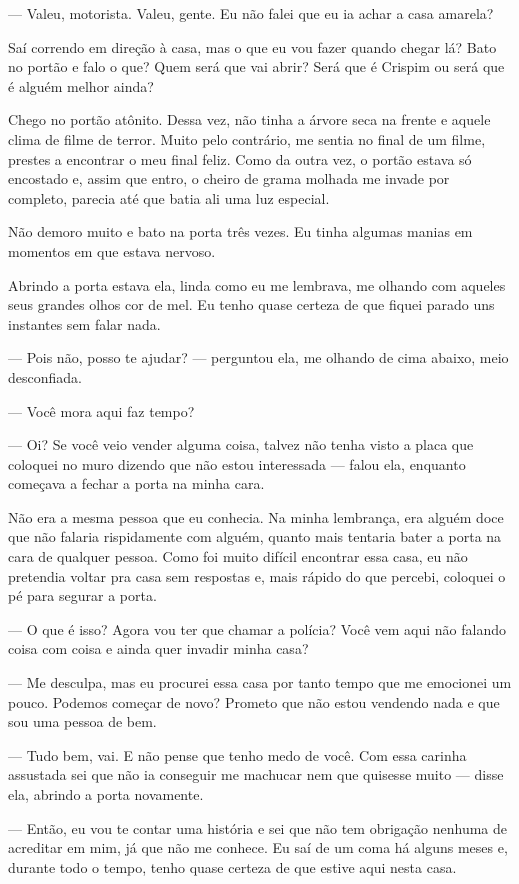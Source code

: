 — Valeu, motorista. Valeu, gente. Eu não falei que eu ia achar a casa amarela?

Saí correndo em direção à casa, mas o que eu vou fazer quando chegar lá? Bato no portão e falo o que? Quem será que vai abrir? Será que é Crispim ou será que é alguém melhor ainda?

Chego no portão atônito. Dessa vez, não tinha a árvore seca na frente e aquele clima de filme de terror. Muito pelo contrário, me sentia no final de um filme, prestes a encontrar o meu final feliz. Como da outra vez, o portão estava só encostado e, assim que entro, o cheiro de grama molhada me invade por completo, parecia até que batia ali uma luz especial.

Não demoro muito e bato na porta três vezes. Eu tinha algumas manias em momentos em que estava nervoso.

Abrindo a porta estava ela, linda como eu me lembrava, me olhando com aqueles seus grandes olhos cor de mel. Eu tenho quase certeza de que fiquei parado uns instantes sem falar nada.

— Pois não, posso te ajudar? — perguntou ela, me olhando de cima abaixo, meio desconfiada.

— Você mora aqui faz tempo?

— Oi? Se você veio vender alguma coisa, talvez não tenha visto a placa que coloquei no muro dizendo que não estou interessada — falou ela, enquanto começava a fechar a porta na minha cara.

Não era a mesma pessoa que eu conhecia. Na minha lembrança, era alguém doce que não falaria rispidamente com alguém, quanto mais tentaria bater a porta na cara de qualquer pessoa. Como foi muito difícil encontrar essa casa, eu não pretendia voltar pra casa sem respostas e, mais rápido do que percebi, coloquei o pé para segurar a porta.

— O que é isso? Agora vou ter que chamar a polícia? Você vem aqui não falando coisa com coisa e ainda quer invadir minha casa?

— Me desculpa, mas eu procurei essa casa por tanto tempo que me emocionei um pouco. Podemos começar de novo? Prometo que não estou vendendo nada e que sou uma pessoa de bem.

— Tudo bem, vai. E não pense que tenho medo de você. Com essa carinha assustada sei que não ia conseguir me machucar nem que quisesse muito — disse ela, abrindo a porta novamente.

— Então, eu vou te contar uma história e sei que não tem obrigação nenhuma de acreditar em mim, já que não me conhece. Eu saí de um coma há alguns meses e, durante todo o tempo, tenho quase certeza de que estive aqui nesta casa.

